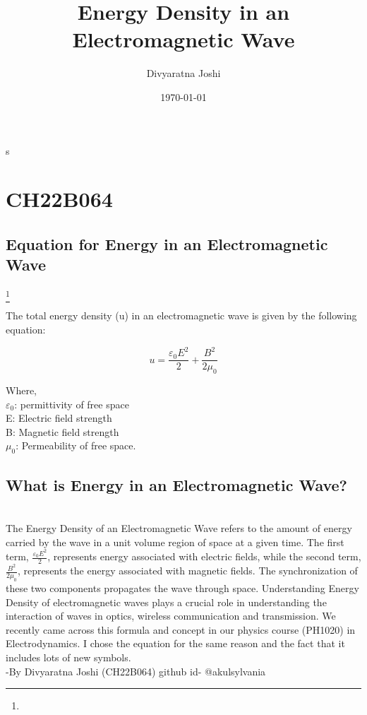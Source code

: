 \documentclass{article}
\begin{document}
\title{Energy Density in an Electromagnetic Wave}
\author{Divyaratna Joshi}
\date{\today}

\maketitle
s
\section{CH22B064}
\subsection{Equation for Energy in an Electromagnetic Wave}
\footnote{}

The total energy density (u) in an electromagnetic wave is given by the following equation:

\[
u = \frac{{\varepsilon_0 E^2}}{2} + \frac{{B^2}}{2\mu_0}
\]

Where,
\\ $\varepsilon_0$: permittivity of free space
\\ E: Electric field strength
\\ B: Magnetic field strength
\\ $\mu_0$: Permeability of free space.

\subsection{What is Energy in an Electromagnetic Wave?}

\\ The Energy Density of an Electromagnetic Wave refers to the amount of energy carried by the wave in a unit volume region of space at a given time. The first term, $\frac{{\varepsilon_0 E^2}}{2}$, represents energy associated with electric fields, while the second term, $\frac{{B^2}}{2\mu_0}$, represents the energy associated with magnetic fields. The synchronization of these two components propagates the wave through space. Understanding Energy Density of electromagnetic waves plays a crucial role in understanding the interaction of waves in optics, wireless communication and transmission. We recently came across this formula and concept in our physics course (PH1020) in Electrodynamics. I chose the equation for the same reason and the fact that it includes lots of new symbols. 
\\ -By Divyaratna Joshi (CH22B064) github id- @akulsylvania
\end{document}
